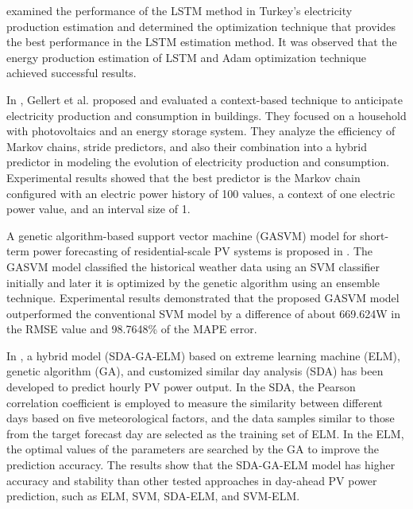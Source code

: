 \cite{9848724} examined the performance of the LSTM method in Turkey's electricity production estimation and determined the optimization technique that provides the best performance in the LSTM estimation method.
It was observed that the energy production estimation of LSTM and Adam optimization technique achieved successful results.

In \cite{GELLERT2019546}, Gellert et al. proposed and evaluated a context-based technique to anticipate electricity production and consumption in buildings.
They focused on a household with photovoltaics and an energy storage system.
They analyze the efficiency of Markov chains, stride predictors, and also their combination into a hybrid predictor in modeling the evolution of electricity production and consumption.
Experimental results showed that the best predictor is the Markov chain configured with an electric power history of 100 values, a context of one electric power value, and an interval size of 1.

A genetic algorithm-based support vector machine (GASVM) model for short-term power forecasting of residential-scale PV systems is proposed in \cite{VANDEVENTER2019367}.
The GASVM model classified the historical weather data using an SVM classifier initially and later it is optimized by the genetic algorithm using an ensemble technique.
Experimental results demonstrated that the proposed GASVM model outperformed the conventional SVM model by a difference of about 669.624W in the RMSE value and 98.7648\% of the MAPE error.

In \cite{ZHOU2020117894}, a hybrid model (SDA-GA-ELM) based on extreme learning machine (ELM), genetic algorithm (GA), and customized similar day analysis (SDA) has been developed to predict hourly PV power output.
In the SDA, the Pearson correlation coefficient is employed to measure the similarity between different days based on five meteorological factors, and the data samples similar to those from the target forecast day are selected as the training set of ELM.
In the ELM, the optimal values of the parameters are searched by the GA to improve the prediction accuracy.
The results show that the SDA-GA-ELM model has higher accuracy and stability than other tested approaches in day-ahead PV power prediction, such as ELM, SVM, SDA-ELM, and SVM-ELM.


